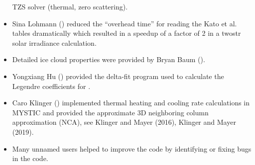 \begin{itemize}
  TZS solver (thermal, zero scattering).
\item Sina Lohmann () reduced the ``overhead time''
  for reading the Kato et al. tables dramatically which resulted in 
  a speedup of a factor of 2 in a twostr solar irradiance calculation.
\item Detailed ice cloud properties were provided by Bryan Baum
  (). 
\item Yongxiang Hu () provided the delta-fit 
  program used to calculate the Legendre coefficients for .
\item Caro Klinger  () implemented
  thermal heating and cooling rate calculations in MYSTIC and provided the
  approximate 3D neighboring column approximation (NCA), see Klinger
  and Mayer (2016), Klinger and Mayer (2019).
\item Many unnamed users helped to improve the code by identifying 
  or fixing bugs in the code. 
\end{itemize}



